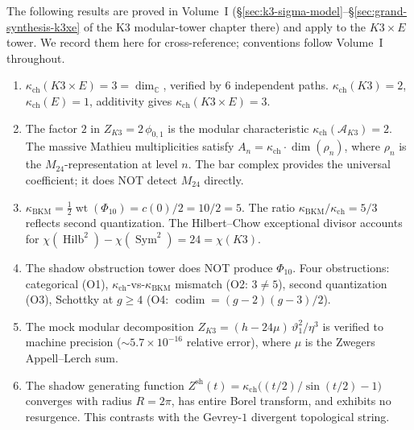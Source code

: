 The following results are proved in Volume~I
(\S\ref{sec:k3-sigma-model}--\S\ref{sec:grand-synthesis-k3xe}
of the K3 modular-tower chapter there) and apply to the $K3 \times E$ tower.
We record them here for cross-reference; conventions
follow Volume~I throughout.

\begin{enumerate}[label=\textup{(K3-\arabic*)}]
\item $\kappa_{\mathrm{ch}}(K3 \times E) = 3 = \dim_\mathbb{C}$, verified by
 $6$ independent paths.
 $\kappa_{\mathrm{ch}}(K3) = 2$, $\kappa_{\mathrm{ch}}(E) = 1$, additivity gives
 $\kappa_{\mathrm{ch}}(K3 \times E) = 3$.

\item The factor $2$ in $Z_{K3} = 2\,\phi_{0,1}$ is the
 modular characteristic $\kappa_{\mathrm{ch}}(\mathcal{A}_{K3}) = 2$.
 The massive Mathieu multiplicities satisfy
 $A_n = \kappa_{\mathrm{ch}} \cdot \dim(\rho_n)$, where $\rho_n$ is the
 $M_{24}$-representation at level $n$. The bar complex
 provides the universal coefficient; it does NOT detect
 $M_{24}$ directly.

\item $\kappa_{\mathrm{BKM}} = \tfrac{1}{2}\operatorname{wt}(\Phi_{10})
 = c(0)/2 = 10/2 = 5$.
 The ratio $\kappa_{\mathrm{BKM}}/\kappa_{\mathrm{ch}}
 = 5/3$ reflects second quantization. The Hilbert--Chow
 exceptional divisor accounts for
 $\chi(\operatorname{Hilb}^2) - \chi(\operatorname{Sym}^2)
 = 24 = \chi(K3)$.

\item The shadow obstruction tower does NOT produce
 $\Phi_{10}$. Four obstructions: categorical (O1),
 $\kappa_{\mathrm{ch}}$-vs-$\kappa_{\mathrm{BKM}}$ mismatch (O2: $3 \neq 5$), second quantization
 (O3), Schottky at $g \geq 4$ (O4:
 $\operatorname{codim} = (g{-}2)(g{-}3)/2$).

\item The mock modular decomposition
 $Z_{K3} = (h - 24\mu)\,\vartheta_1^2/\eta^3$
 is verified to machine precision ($\sim 5.7 \times 10^{-16}$
 relative error), where $\mu$ is the Zwegers
 Appell--Lerch sum.

\item The shadow generating function
 $Z^{\mathrm{sh}}(t) = \kappa_{\mathrm{ch}}\bigl((t/2)/\sin(t/2) - 1\bigr)$
 converges with radius $R = 2\pi$, has entire Borel
 transform, and exhibits no resurgence. This contrasts
 with the Gevrey-$1$ divergent topological string.


\end{enumerate}
